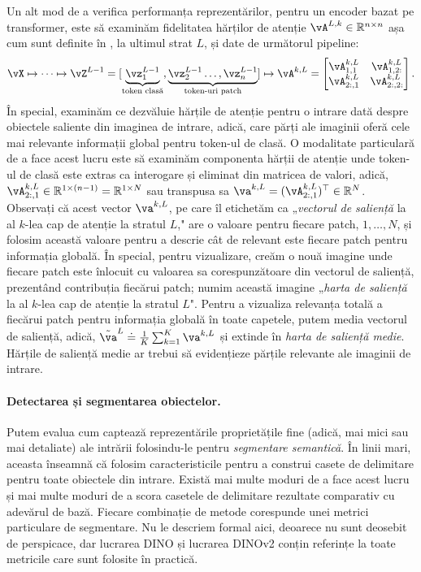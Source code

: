 \documentclass[../../book-main_ro.tex]{subfiles}
\begin{document}
Un alt mod de a verifica performanța reprezentărilor, pentru un encoder bazat pe transformer, este să examinăm fidelitatea hărților de atenție \(\vA^{L, k} \in \R^{n \times n}\) așa cum sunt definite în , la ultimul strat \(L\), și date de următorul pipeline:
\begin{align}
    \vX \mapsto \cdots \mapsto \vZ^{L - 1} = [\underbrace{\vz_{1}^{L - 1}}_{\text{token clasă}}, \underbrace{\vz_{2}^{L - 1} \dots, \vz_{n}^{L - 1}}_{\text{token-uri patch}}] \mapsto \vA^{k, L} = \mat{\vA_{1, 1}^{k, L} & \vA_{1, 2:}^{k, L} \\ \vA_{2:, 1}^{k, L} & \vA_{2:, 2:}^{k, L}}.
\end{align}
În special, examinăm ce dezvăluie hărțile de atenție pentru o intrare dată despre obiectele saliente din imaginea de intrare, adică, care părți ale imaginii oferă cele mai relevante informații global pentru token-ul de clasă. O modalitate particulară de a face acest lucru este să examinăm componenta hărții de atenție unde token-ul de clasă este extras ca interogare și eliminat din matricea de valori, adică, \(\vA_{2:, 1}^{k, L} \in \R^{1 \times (n - 1)} = \R^{1 \times N}\) sau transpusa sa \(\va^{k, L} = (\vA_{2:, 1}^{k, L})^{\top} \in \R^{N}\). Observați că acest vector \(\va^{k, L}\), pe care îl etichetăm ca „\textit{vectorul de saliență} la al \(k\)-lea cap de atenție la stratul \(L\)," are o valoare pentru fiecare patch, \(1, \dots, N\), și folosim această valoare pentru a descrie cât de relevant este fiecare patch pentru informația globală. În special, pentru vizualizare, creăm o nouă imagine unde fiecare patch este înlocuit cu valoarea sa corespunzătoare din vectorul de saliență, prezentând contribuția fiecărui patch; numim această imagine „\textit{harta de saliență} la al \(k\)-lea cap de atenție la stratul \(L\)". Pentru a vizualiza relevanța totală a fiecărui patch pentru informația globală în toate capetele, putem media vectorul de saliență, adică, \(\tilde{\va}^{L} \doteq \frac{1}{K}\sum_{k = 1}^{K}\va^{k, L}\) și extinde în \textit{harta de saliență medie}. Hărțile de saliență medie ar trebui să evidențieze părțile relevante ale imaginii de intrare.


\paragraph{Detectarea și segmentarea obiectelor.}

Putem evalua cum captează reprezentările proprietățile fine (adică, mai mici sau mai detaliate) ale intrării folosindu-le pentru \textit{segmentare semantică}. În linii mari, aceasta înseamnă că folosim caracteristicile pentru a construi casete de delimitare pentru toate obiectele din intrare. Există mai multe moduri de a face acest lucru și mai multe moduri de a scora casetele de delimitare rezultate comparativ cu adevărul de bază. Fiecare combinație de metode corespunde unei metrici particulare de segmentare. Nu le descriem formal aici, deoarece nu sunt deosebit de perspicace, dar lucrarea DINO \citep{caron2021emerging} și lucrarea DINOv2 \citep{oquab2023dinov2} conțin referințe la toate metricile care sunt folosite în practică.
\end{document}
